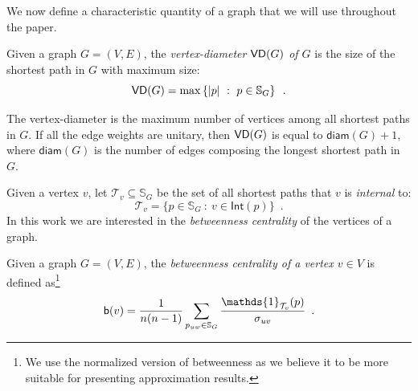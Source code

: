 We now define a characteristic quantity of a graph that we will use throughout
the paper.
\begin{definition}\label{def:centrsamplvertexdiam}
  Given a graph $G=(V,E)$, the \emph{vertex-diameter $\mathsf{VD}(G)$ of $G$} is the
  size of the shortest path in $G$ with maximum size:
  \[
  \mathsf{VD}(G) = \max\left\{|p| ~:~ p\in \mathbb{S}_G\right\}\enspace.\]
\end{definition}
The vertex-diameter is the maximum number of vertices among all shortest paths
in $G$. If all the edge weights are unitary, then $\mathsf{VD}(G)$ is equal to
$\mathsf{diam}(G)+1$, where $\mathsf{diam}(G)$ is the number of edges composing
the longest shortest path in $G$. 

Given a vertex $v$, let $\mathcal{T}_v\subseteq\mathbb{S}_G$ be the set of all
shortest paths that $v$ is \emph{internal} to:
\[
\mathcal{T}_v=\{p\in\mathbb{S}_G ~:~ v\in\mathsf{Int}(p)\}\enspace.
\]
In this work we are interested in the \emph{betweenness centrality} of the
vertices of a graph.

\begin{definition}\label{def:centrsamplbetwenness}
  \citep{Anthonisse71,Freeman77} Given a graph $G=(V,E)$, the \emph{betweenness
  centrality of a vertex $v\in V$} is defined as\footnote{We use the normalized
  version of betweenness as we believe it to be more suitable for presenting
  approximation results.}
  \[
  \betw(v)=\frac{1}{n(n-1)}\sum_{p_{uw}\in\mathbb{S}_G}\frac{\mathds{1}_{\mathcal{T}_v}(p)}{\sigma_{uv}}%
  \enspace.
  \]
\end{definition} 

